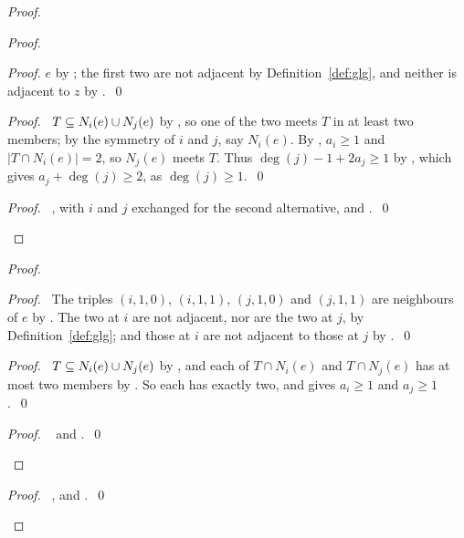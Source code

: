 \begin{proof}
\begin{proof}
\begin{proof}
   $e$ by ; the first two are not adjacent by Definition~\ref{def:glg}, and
   neither is adjacent to $z$ by .~\qed\end{proof}
  \begin{proof}\pf\ $T\subseteq N_i(e)\cup N_j(e)$ by , so one of the two meets $T$
   in at least two members; by the symmetry of $i$ and $j$, say $N_i(e)$. By
   , $a_i\ge1$ and $|T\cap N_i(e)|=2$, so $N_j(e)$ meets $T$. Thus
   $\deg(j)-1+2a_j\ge1$ by , which gives $a_j+\deg(j)\ge2$, as
   $\deg(j)\ge1$.~\qed\end{proof}
  \qedstep
  \begin{proof}\pf\ , with $i$ and $j$ exchanged for the second alternative,
   and .~\qed\end{proof}
 \end{proof}
 \begin{proof}
  \begin{proof}\pf\ The triples $(i,1,0)$, $(i,1,1)$, $(j,1,0)$ and $(j,1,1)$ are neighbours of $e$
   by . The two at $i$ are not adjacent, nor are the two at $j$, by
   Definition~\ref{def:glg}; and those at $i$ are not adjacent to those at $j$ by
   .~\qed\end{proof}
  \begin{proof}\pf\ $T\subseteq N_i(e)\cup N_j(e)$ by , and each of $T\cap N_i(e)$ and
   $T\cap N_j(e)$ has at most two members by . So each has exactly two, and
    gives $a_i\ge1$ and $a_j\ge1$.~\qed\end{proof}
  \qedstep
  \begin{proof}\pf\  and .~\qed\end{proof}
 \end{proof}
 \qedstep
 \begin{proof}\pf\ ,  and .~\qed\end{proof}
\end{proof}

